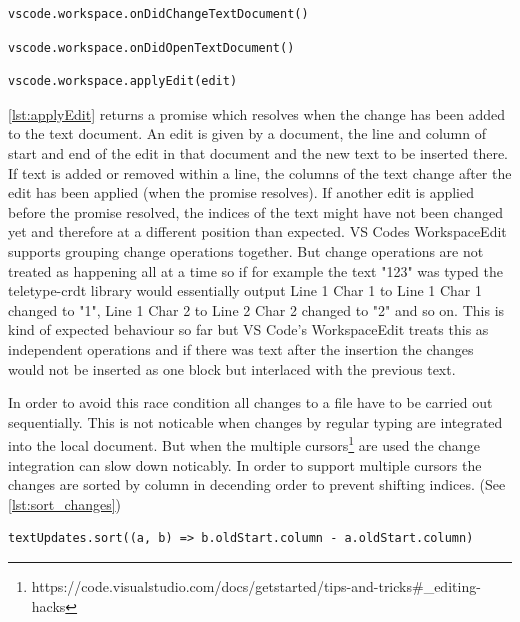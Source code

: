 \begin{lstlisting}[label={lst:onDidChangeTextDocument}, caption=VS Code API onDidChangeTextDocument]
vscode.workspace.onDidChangeTextDocument()
\end{lstlisting}

\begin{lstlisting}[label={lst:onDidOpenTextDocument}, caption=VS Code API onDidOpenTextDocument]
vscode.workspace.onDidOpenTextDocument()
\end{lstlisting}

\begin{lstlisting}[label={lst:applyEdit}, caption=VS Code API applyEdit]
vscode.workspace.applyEdit(edit)
\end{lstlisting}

\ref{lst:applyEdit} returns a promise which resolves when the change has been added to the text document.
An edit is given by a document, the line and column of start and end of the edit in that document and the new text to be inserted there.
If text is added or removed within a line, the columns of the text change after the edit has been applied (when the promise resolves). If another edit is applied before the promise resolved, the indices of the text might have not been changed yet and therefore at a different position than expected. VS Codes WorkspaceEdit supports grouping change operations together. But change operations are not treated as happening all at a time so if for example the text "123" was typed the teletype-crdt library would essentially output Line 1 Char 1 to Line 1 Char 1 changed to "1", Line 1 Char 2 to Line 2 Char 2 changed to "2" and so on. This is kind of expected behaviour so far but VS Code's WorkspaceEdit treats this as independent operations and if there was text after the insertion the changes would not be inserted as one block but interlaced with the previous text. 

In order to avoid this race condition all changes to a file have to be carried out sequentially. This is not noticable when changes by regular typing are integrated into the local document. But when the multiple cursors\footnote{https://code.visualstudio.com/docs/getstarted/tips-and-tricks\#\_editing-hacks} are used the change integration can slow down noticably. In order to support multiple cursors the changes are sorted by column in decending order to prevent shifting indices. (See \ref{lst:sort_changes})
\begin{lstlisting}[label={lst:sort_changes}, caption=Sorting Changes by Column to Prevent Index Shifting]
textUpdates.sort((a, b) => b.oldStart.column - a.oldStart.column)
\end{lstlisting}

